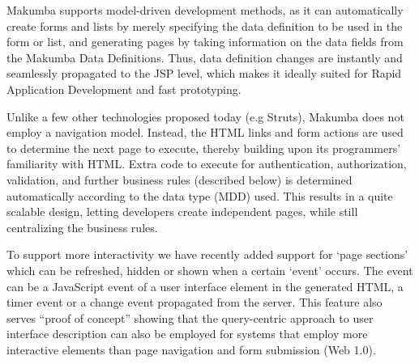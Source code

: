 \documentclass{chi2009}
\begin{document}
Makumba supports model-driven development methods, as it can automatically create forms and lists by merely specifying the data definition to be used in the form or list, and generating pages by taking information on the data fields from the Makumba Data Definitions.%
Thus, data definition changes are instantly and seamlessly propagated to the JSP level, which makes it ideally suited for Rapid Application Development and fast prototyping. %

Unlike a few other technologies proposed today (e.g Struts), Makumba does not employ a navigation model. Instead, the HTML links and form actions are used to determine the next page to execute, thereby building upon its programmers' familiarity with HTML. Extra code to execute for authentication, authorization, validation, and further business rules (described below) is determined automatically according to the data type (MDD) used. This results in a quite scalable design, letting developers create independent pages, while still centralizing the business rules. %

To support more interactivity we have recently added support for `page sections' which can be refreshed, hidden or shown when a certain `event' occurs. The event can be a JavaScript event of a user interface element in the generated HTML, a timer event or a change event propagated from the server. This feature also serves ``proof of concept'' showing that the query-centric approach to user interface description can also be employed for systems that employ more interactive elements than page navigation and form submission (Web 1.0).
\end{document}

